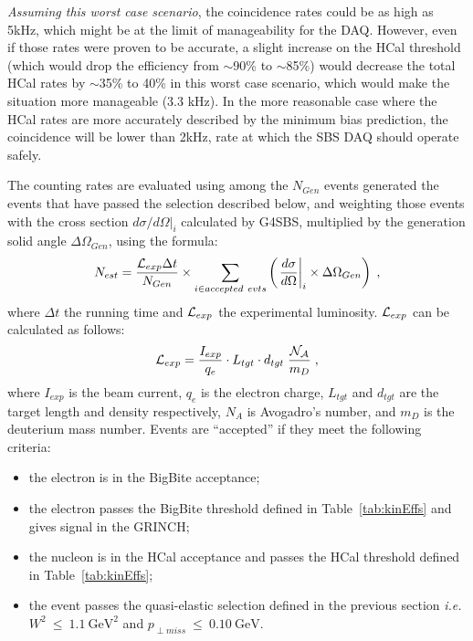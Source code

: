{\em Assuming this worst case scenario}, the coincidence rates could be as high as 5kHz, which might be at the limit of manageability for the DAQ.
However, even if those rates were proven to be accurate, a slight increase on the HCal threshold (which would drop the efficiency from $\sim$90\% to $\sim$85\%) would decrease the total HCal rates by $\sim$35\% to 40\% in this worst case scenario, which would make the situation more manageable (3.3 kHz).
In the more reasonable case where the HCal rates are more accurately described by the minimum bias prediction, the coincidence will be lower than 2kHz, rate at which the SBS DAQ should operate safely.
  
The counting rates are evaluated using among the $N_{Gen}$ events generated the events that have passed the selection described below, and weighting those events with the cross section ${d\sigma}/{d\Omega}|_i$ calculated by G4SBS, multiplied by the generation solid angle $\Delta\Omega_{Gen}$, using the formula:
\begin{equation}
  N_{est} = \frac{{\cal L}_{exp} \Delta t}{N_{Gen}} \times \sum_{i \in accepted~evts}\left( \left. \frac{d\sigma}{d\Omega}\right|_i \times \Delta\Omega_{Gen} \right) \;,
\end{equation}
where $\Delta t$ the running time and ${\cal L}_{exp}$ the experimental luminosity. ${\cal L}_{exp}$ can be calculated as follows:
\begin{equation}
  {\cal{L}}_{exp} = \frac{I_{exp}}{q_e}\cdot L_{tgt}\cdot d_{tgt}\;\frac{\cal{N}_A}{m_{D}}\;,
\end{equation}
where $I_{exp}$ is the beam current, $q_e$ is the electron charge, $L_{tgt}$ and $d_{tgt}$ are the target length and density respectively, $N_A$ is Avogadro's number, and $m_D$ is the deuterium mass number.
Events are ``accepted'' if they meet the following criteria:
%
\begin{itemize}
\item{the electron is in the BigBite acceptance};
\item{the electron passes the BigBite threshold defined in Table~\ref{tab:kinEffs} and gives signal in the GRINCH;}
\item{the nucleon is in the HCal acceptance and passes the HCal threshold defined in Table~\ref{tab:kinEffs};}
\item{the event passes the quasi-elastic selection defined in the previous section {\it i.e.} $W^2~\leq~1.1~\mathrm{GeV}^2$ and $p_{\perp miss}~\leq~0.10~\mathrm{GeV}$.} 
\end{itemize}
%

